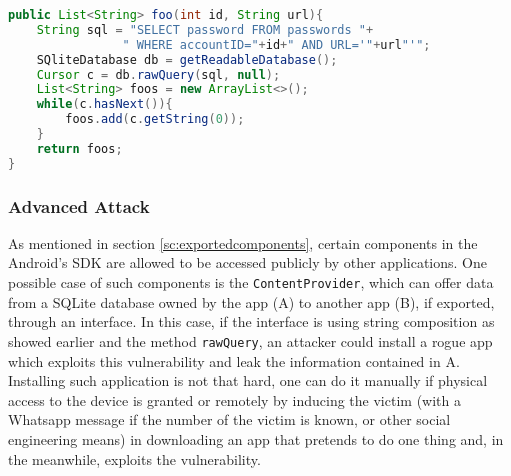 \lstset{numbers=left, numberstyle=\tiny, stepnumber=1, numbersep=5pt}
\begin{lstlisting}[language=Java, label={lst:injection}, caption="SQL injection example", captionpos=b]
public List<String> foo(int id, String url){
	String sql = "SELECT password FROM passwords "+
	   			" WHERE accountID="+id+" AND URL='"+url"'";
	SQliteDatabase db = getReadableDatabase();
	Cursor c = db.rawQuery(sql, null);
	List<String> foos = new ArrayList<>();
	while(c.hasNext()){
		foos.add(c.getString(0));
	}
	return foos;
}
\end{lstlisting}



\subsubsection{Advanced Attack} 
As mentioned in section \ref{sc:exportedcomponents}, certain components in the Android's SDK  are allowed to be accessed publicly by other applications. One possible case of such components is the \texttt{ContentProvider}, which can offer data from a SQLite database owned by the app (A) to another app (B), if exported, through an interface. In this case, if the interface is using string composition as showed earlier and the method \texttt{rawQuery}, an attacker could install a rogue app which exploits this vulnerability and leak the information contained in A. Installing such application is not that hard, one can do it manually if physical access to the device is granted or remotely by inducing the victim (with a Whatsapp message if the number of the victim is known, or other social engineering means) in downloading an app that pretends to do one thing and, in the meanwhile, exploits the vulnerability.

